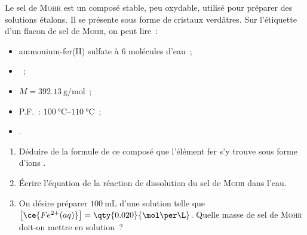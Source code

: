 Le sel de \textsc{Mohr} est un composé stable, peu oxydable, utilisé pour
préparer des solutions étalons. Il se présente sous forme de cristaux verdâtres.
Sur l'étiquette d'un flacon de sel de \textsc{Mohr}, on peut lire~:

\begin{itemize}
    \item ammonium-fer(II) sulfate à 6 molécules d'eau~;
    \item {}~;
    \item $M=\qty{392.13}{\g\per\mol}$~;
    \item P.F.~: $\qtyrange{100}{110}{\degreeCelsius}$~;
    \item {}.
\end{itemize}
\begin{enumerate}
    \item Déduire de la formule de ce composé que l'élément fer s'y trouve sous
          forme d'ions .
    \item Écrire l'équation de la réaction de dissolution du sel de
          \textsc{Mohr} dans l'eau.
    \item On désire préparer $\qty{100}{\mL}$ d'une solution telle que
          $\left[\ce{Fe^{2+}(aq)}\right]=\qty{0.020}{\mol\per\L}$. Quelle masse
          de sel de \textsc{Mohr} doit-on mettre en solution~?
\end{enumerate}

